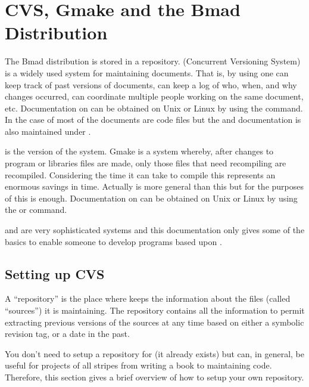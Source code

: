 \chapter{CVS, Gmake and the Bmad Distribution}
\label{c:cvs_gmake}

The Bmad distribution is stored in a \cvs repository. \cvs
(Concurrent Versioning System) is a widely used system for maintaining
documents. That is, by using \cvs one can keep track of past
versions of documents, can keep a log of who, when, and why changes
occurred, can coordinate multiple people working on the same document,
etc.  Documentation on \cvs can be obtained on Unix or Linux by
using the  command. In the case of \bmad most of the
documents are code files but the \bmad and \tao documentation is
also maintained under \cvs.

 is the  version of the  system. Gmake is a
system whereby, after changes to program or libraries files are made,
only those files that need recompiling are recompiled. Considering the
time it can take to compile this represents an enormous savings in
time. Actually  is more general than this but for the
purposes of \bmad this is enough. Documentation on 
can be obtained on Unix or Linux by using the  or
 command.

\cvs and  are very sophisticated systems and this
documentation only gives some of the basics to enable someone to
develop programs based upon \bmad.

\section{Setting up CVS}
\label{s:cvs_setup}

A ``repository'' is the place where \cvs keeps the information
about the files (called ``sources'') it is maintaining. The repository
contains all the information to permit extracting previous versions of
the sources at any time based on either a symbolic revision tag, or a
date in the past.

You don't need to setup a \cvs repository for \bmad (it already
exists) but \cvs can, in general, be useful for projects of all
stripes from writing a book to maintaining code. Therefore, this
section gives a brief overview of how to setup your own \cvs
repository.

